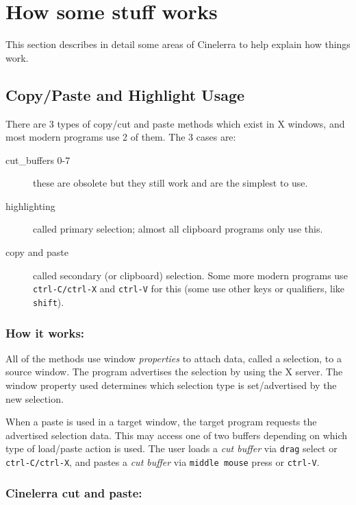 \chapter{How some stuff works}%
\label{cha:how_stuff_works}

This section describes in detail some areas of Cinelerra to help explain how things work.

\section{Copy/Paste and Highlight Usage}%
\label{sec:copy_paste_highlight_usage}

There are 3 types of copy/cut and paste methods which exist in X windows, and most modern programs use 2 of them.  The 3 cases are:

\begin{description}
    \item[cut\_buffers 0-7] these are obsolete but they still work and are the simplest to use.
    \item[highlighting] called primary selection; almost all clipboard programs only use this.
    \item[copy and paste] called secondary (or clipboard) selection. Some more modern programs use \texttt{ctrl-C/ctrl-X} and \texttt{ctrl-V} for this (some use other keys or qualifiers, like \texttt{shift}).
\end{description}

\subsection*{How it works:}%
\label{sub:how_it_works}

All of the methods use window \textit{properties} to attach data, called a selection, to a source window.  The program advertises the selection by using the X server.  The window property used determines which selection type is set/advertised by the new selection.

When a paste is used in a target window, the target program requests the advertised selection data.  This may access one of two buffers depending on which type of load/paste action is used.  The user loads a \textit{cut buffer} via \texttt{drag} select or \texttt{ctrl-C/ctrl-X}, and pastes a \textit{cut buffer} via \texttt{middle mouse} press or \texttt{ctrl-V}.

\subsection*{Cinelerra cut and paste:}%
\label{sub:cinelerra_cut_paste}


